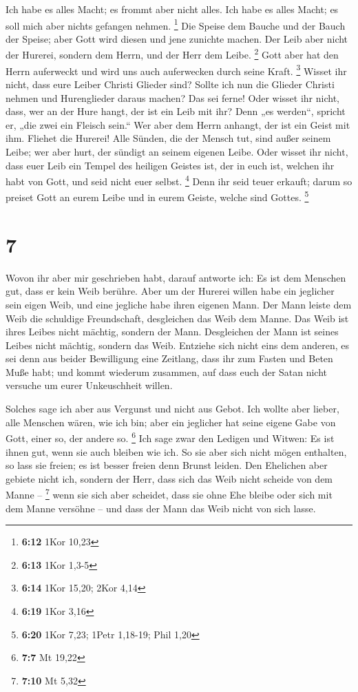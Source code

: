  Ich habe es alles Macht; es frommt aber nicht alles. Ich
habe es alles Macht; es soll mich aber nichts gefangen nehmen.
\footnote{\textbf{6:12} 1Kor 10,23}  Die Speise dem
Bauche und der Bauch der Speise; aber Gott wird diesen und jene zunichte
machen. Der Leib aber nicht der Hurerei, sondern dem Herrn, und der Herr
dem Leibe. \footnote{\textbf{6:13} 1Kor 1,3-5}  Gott aber
hat den Herrn auferweckt und wird uns auch auferwecken durch seine
Kraft. \footnote{\textbf{6:14} 1Kor 15,20; 2Kor 4,14} 
Wisset ihr nicht, dass eure Leiber Christi Glieder sind? Sollte ich nun
die Glieder Christi nehmen und Hurenglieder daraus machen? Das sei
ferne!  Oder wisset ihr nicht, dass, wer an der Hure
hangt, der ist ein Leib mit ihr? Denn „es werden``, spricht er, „die
zwei ein Fleisch sein.``  Wer aber dem Herrn anhangt, der
ist ein Geist mit ihm.  Fliehet die Hurerei! Alle Sünden,
die der Mensch tut, sind außer seinem Leibe; wer aber hurt, der sündigt
an seinem eigenen Leibe.  Oder wisset ihr nicht, dass
euer Leib ein Tempel des heiligen Geistes ist, der in euch ist, welchen
ihr habt von Gott, und seid nicht euer selbst. \footnote{\textbf{6:19}
  1Kor 3,16}  Denn ihr seid teuer erkauft; darum so
preiset Gott an eurem Leibe und in eurem Geiste, welche sind Gottes.
\footnote{\textbf{6:20} 1Kor 7,23; 1Petr 1,18-19; Phil 1,20}

\hypertarget{section-3}{%
\section{7}\label{section-3}}

 Wovon ihr aber mir geschrieben habt, darauf antworte ich:
Es ist dem Menschen gut, dass er kein Weib berühre.  Aber
um der Hurerei willen habe ein jeglicher sein eigen Weib, und eine
jegliche habe ihren eigenen Mann.  Der Mann leiste dem
Weib die schuldige Freundschaft, desgleichen das Weib dem Manne.
 Das Weib ist ihres Leibes nicht mächtig, sondern der
Mann. Desgleichen der Mann ist seines Leibes nicht mächtig, sondern das
Weib.  Entziehe sich nicht eins dem anderen, es sei denn
aus beider Bewilligung eine Zeitlang, dass ihr zum Fasten und Beten Muße
habt; und kommt wiederum zusammen, auf dass euch der Satan nicht
versuche um eurer Unkeuschheit willen.

 Solches sage ich aber aus Vergunst und nicht aus Gebot.
 Ich wollte aber lieber, alle Menschen wären, wie ich bin;
aber ein jeglicher hat seine eigene Gabe von Gott, einer so, der andere
so. \footnote{\textbf{7:7} Mt 19,22}  Ich sage zwar den
Ledigen und Witwen: Es ist ihnen gut, wenn sie auch bleiben wie ich.
 So sie aber sich nicht mögen enthalten, so lass sie
freien; es ist besser freien denn Brunst leiden.  Den
Ehelichen aber gebiete nicht ich, sondern der Herr, dass sich das Weib
nicht scheide von dem Manne -- \footnote{\textbf{7:10} Mt 5,32}
 wenn sie sich aber scheidet, dass sie ohne Ehe bleibe
oder sich mit dem Manne versöhne -- und dass der Mann das Weib nicht von
sich lasse.

